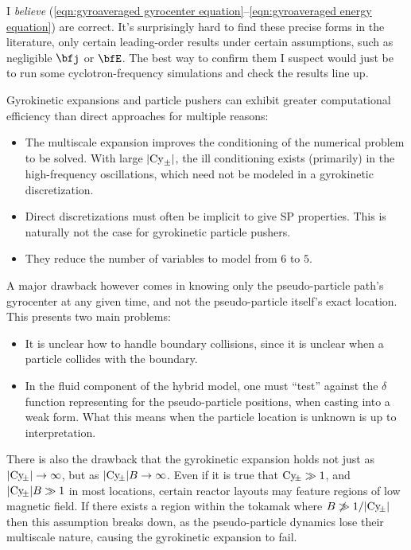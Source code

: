    \begin{remark}
        I \emph{believe} (\ref{eqn:gyroaveraged gyrocenter equation}--\ref{eqn:gyroaveraged energy equation}) are correct. It's surprisingly hard to find these precise forms in the literature, only certain leading-order results under certain assumptions, such as negligible $\bfj$ or $\bfE$. The best way to confirm them I suspect would just be to run some cyclotron-frequency simulations and check the results line up.
    \end{remark}

    \shortline

    Gyrokinetic expansions and particle pushers can exhibit greater computational efficiency than direct approaches for multiple reasons:
    \begin{itemize}
        \item  The multiscale expansion improves the conditioning of the numerical problem to be solved. With large $|\mathrm{Cy}_{\pm}|$, the ill conditioning exists (primarily) in the high-frequency oscillations, which need not be modeled in a gyrokinetic discretization.
        \item  Direct discretizations must often be implicit to give SP properties. This is naturally not the case for gyrokinetic particle pushers. 
        \item  They reduce the number of variables to model from $6$ to $5$.
    \end{itemize}

    A major drawback however comes in knowing only the pseudo-particle path's gyrocenter at any given time, and not the pseudo-particle itself's exact location. This presents two main problems:
    \begin{itemize}
        \item  It is unclear how to handle boundary collisions, since it is unclear when a particle collides with the boundary.
        \item  In the fluid component of the hybrid model, one must ``test'' against the $\delta$ function representing for the pseudo-particle positions, when casting into a weak form. What this means when the particle location is unknown is up to interpretation.
    \end{itemize}
    There is also the drawback that the gyrokinetic expansion holds not just as $|\mathrm{Cy}\!_{\pm}| \rightarrow \infty$, but as $|\mathrm{Cy}\!_{\pm}|B \rightarrow \infty$. Even if it is true that $\mathrm{Cy}\!_{\pm} \gg 1$, and $|\mathrm{Cy}\!_{\pm}|B \gg 1$ in most locations, certain reactor layouts may feature regions of low magnetic field. If there exists a region within the tokamak where $B \not\gg 1/|\mathrm{Cy}\!_{\pm}|$ then this assumption breaks down, as the pseudo-particle dynamics lose their multiscale nature, causing the gyrokinetic expansion to fail.
